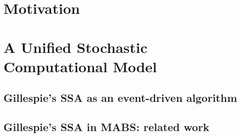 \documentclass[presentation]{beamer} %
\begin{document}
\section{Motivation}


\begin{frame}{}
\end{frame}

\section{A Unified Stochastic Computational Model}


\begin{frame}{}
\end{frame}


\subsection{Gillespie's SSA as an event-driven algorithm}

\begin{frame}{}
\end{frame}

\subsection{Gillespie's SSA in MABS: related work}


\begin{frame}{}
\end{frame}
\end{document}
